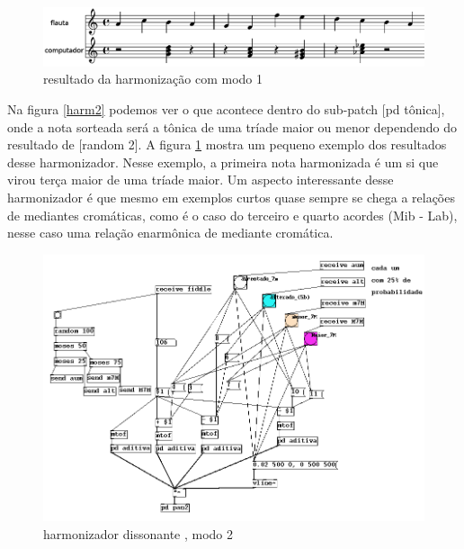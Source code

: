 \documentclass[draft]{ppgmus}
\begin{document}
\begin{figure}
\includegraphics[scale=.4]{harm3}
\caption{resultado da harmonização com modo 1}
\label{harm3}
\end{figure}


Na figura \ref{harm2} podemos ver o que acontece dentro do sub-patch [pd tônica], onde a nota sorteada 
será a tônica de uma tríade maior ou menor dependendo do resultado de [random 2]. A figura \ref{harm3} 
mostra um pequeno exemplo dos resultados desse harmonizador. Nesse exemplo, a primeira nota 
harmonizada é um si que virou terça maior de uma tríade maior. Um aspecto interessante desse 
harmonizador é que mesmo em exemplos curtos quase sempre se chega a relações de mediantes 
cromáticas, como é o caso do terceiro e quarto acordes (Mib - Lab), nesse caso uma relação 
enarmônica de mediante cromática.

\begin{figure}
\includegraphics[scale=.5]{harm4}
\caption{harmonizador dissonante , modo 2}
\label{harm4}
\end{figure}
\end{document}
